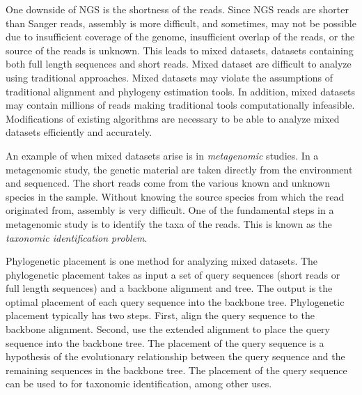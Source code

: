 \documentclass[times, 10pt]{article}
\begin{document}
One downside of NGS is the shortness of the reads.  Since NGS reads are shorter than Sanger reads, assembly is more difficult, and sometimes, may not be possible due to insufficient coverage of the genome, insufficient overlap of the reads, or the source of the reads is unknown.  This leads to mixed datasets, datasets containing both full length sequences and short reads.  Mixed dataset are difficult to analyze using traditional approaches.  Mixed datasets may violate the assumptions of traditional alignment and phylogeny estimation tools.  In addition, mixed datasets may contain millions of reads making traditional tools computationally infeasible. Modifications of existing algorithms are necessary to be able to analyze mixed datasets efficiently and accurately.

An example of when mixed datasets arise is in \emph{metagenomic} studies.  In a metagenomic study, the genetic material are taken directly from the environment and sequenced.  The short reads come from the various known and unknown species in the sample.  Without knowing the source species from which the read originated from, assembly is very difficult.  One of the fundamental steps in a metagenomic study is to identify the taxa of the reads.  This is known as the \emph{taxonomic identification problem}.  %

Phylogenetic placement is one method for analyzing mixed datasets.  The phylogenetic placement takes as input a set of query sequences (short reads or full length sequences) and a backbone alignment and tree.  The output is the optimal placement of each query sequence into the backbone tree.  Phylogenetic placement typically has two steps.  First, align the query sequence to the backbone alignment.  Second, use the extended alignment to place the query sequence into the backbone tree.  The placement of the query sequence is a hypothesis of the evolutionary relationship between the query sequence and the remaining sequences in the backbone tree.  The placement of the query sequence can be used to for taxonomic identification, among other uses.%

\end{document}
